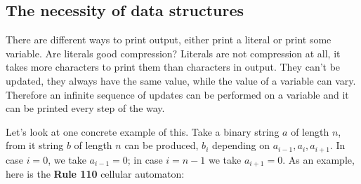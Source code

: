\newpage

\begin{center}
\end{center}

\newpage

\subsection{The necessity of data structures}

There are different ways to print output, either print a literal or print some variable.
Are literals good compression?
Literals are not compression at all, it takes more characters to print them than characters in output.
They can't be updated, they always have the same value, while the value of a variable can vary.
Therefore an infinite sequence of updates can be performed on a variable and it can be printed every step of the way.

Let's look at one concrete example of this.
Take a binary string $a$ of length $n$, from it string $b$ of length $n$ can be produced, $b_i$ depending on $a_{i-1}, a_i, a_{i+1}$.
In case $i=0$, we take $a_{i-1} = 0$; in case $i=n-1$ we take $a_{i+1} = 0$.
As an example, here is the \textbf{Rule 110} cellular automaton:

